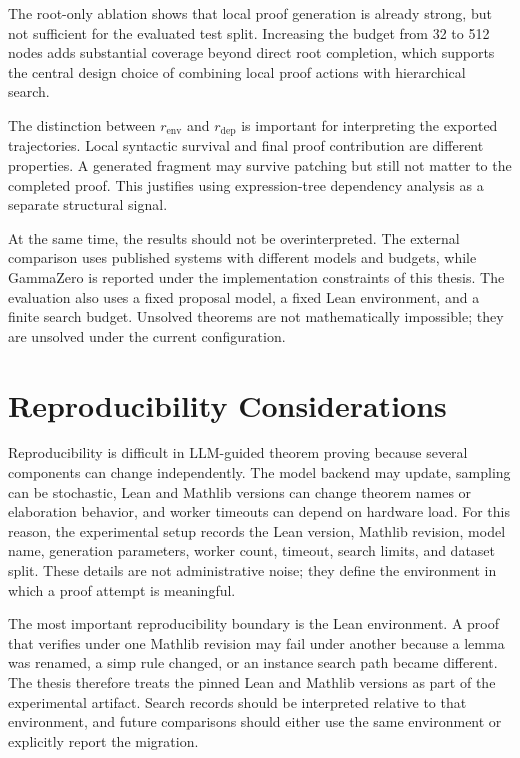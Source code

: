 The root-only ablation shows that local proof generation is already strong, but not sufficient for the
evaluated test split. Increasing the budget from 32 to 512 nodes adds substantial coverage beyond direct
root completion, which supports the central design choice of combining local proof actions with
hierarchical search.

The distinction between \(r_{\mathrm{env}}\) and \(r_{\mathrm{dep}}\) is important for interpreting the exported trajectories. Local syntactic survival and final proof contribution are different properties. A generated fragment may survive patching but still not matter to the completed proof. This justifies using expression-tree dependency analysis as a separate structural signal.

At the same time, the results should not be overinterpreted. The external comparison uses published
systems with different models and budgets, while GammaZero is reported under the implementation
constraints of this thesis. The evaluation also
uses a fixed proposal model, a fixed Lean environment, and a finite search budget. Unsolved theorems
are not mathematically impossible; they are unsolved under the current configuration.


\section{Reproducibility Considerations}

Reproducibility is difficult in LLM-guided theorem proving because several components can change
independently. The model backend may update, sampling can be stochastic, Lean and Mathlib versions
can change theorem names or elaboration behavior, and worker timeouts can depend on hardware load.
For this reason, the experimental setup records the Lean version, Mathlib revision, model name, generation
parameters, worker count, timeout, search limits, and dataset split. These details are not administrative
noise; they define the environment in which a proof attempt is meaningful.

The most important reproducibility boundary is the Lean environment. A proof that verifies under one
Mathlib revision may fail under another because a lemma was renamed, a simp rule changed, or an
instance search path became different. The thesis therefore treats the pinned Lean and Mathlib versions
as part of the experimental artifact. Search records should be interpreted relative to that environment,
and future comparisons should either use the same environment or explicitly report the migration.

